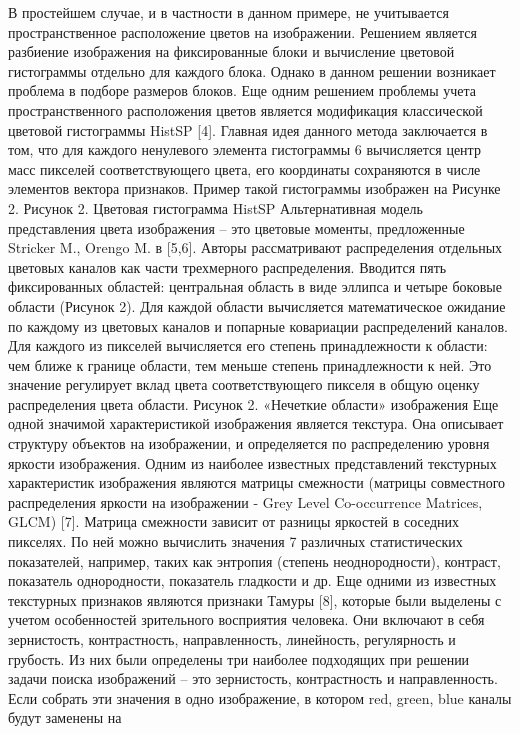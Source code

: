 В простейшем случае, и в частности в данном примере, не учитывается
пространственное расположение цветов на изображении. Решением является разбиение
изображения на фиксированные блоки и вычисление цветовой гистограммы отдельно для
каждого блока. Однако в данном решении возникает проблема в подборе размеров блоков.
Еще одним решением проблемы учета пространственного расположения цветов является
модификация классической цветовой гистограммы HistSP [4]. Главная идея данного
метода заключается в том, что для каждого ненулевого элемента гистограммы 
6
вычисляется центр масс пикселей соответствующего цвета, его координаты сохраняются в
числе элементов вектора признаков. Пример такой гистограммы изображен на Рисунке 2.
Рисунок 2. Цветовая гистограмма HistSP
Альтернативная модель представления цвета изображения – это цветовые
моменты, предложенные Stricker M., Orengo M. в [5,6]. Авторы рассматривают
распределения отдельных цветовых каналов как части трехмерного распределения.
Вводится пять фиксированных областей: центральная область в виде эллипса и четыре
боковые области (Рисунок 2). Для каждой области вычисляется математическое ожидание
по каждому из цветовых каналов и попарные ковариации распределений каналов. Для
каждого из пикселей вычисляется его степень принадлежности к области: чем ближе к
границе области, тем меньше степень принадлежности к ней. Это значение регулирует
вклад цвета соответствующего пикселя в общую оценку распределения цвета области.
Рисунок 2. «Нечеткие области» изображения
Еще одной значимой характеристикой изображения является текстура. Она
описывает структуру объектов на изображении, и определяется по распределению уровня
яркости изображения.
Одним из наиболее известных представлений текстурных характеристик
изображения являются матрицы смежности (матрицы совместного распределения яркости
на изображении - Grey Level Co-occurrence Matrices, GLCM) [7]. Матрица смежности
зависит от разницы яркостей в соседних пикселях. По ней можно вычислить значения 
7
различных статистических показателей, например, таких как энтропия (степень
неоднородности), контраст, показатель однородности, показатель гладкости и др.
Еще одними из известных текстурных признаков являются признаки Тамуры [8],
которые были выделены с учетом особенностей зрительного восприятия человека. Они
включают в себя зернистость, контрастность, направленность, линейность, регулярность и
грубость. Из них были определены три наиболее подходящих при решении задачи поиска
изображений – это зернистость, контрастность и направленность. Если собрать эти
значения в одно изображение, в котором red, green, blue каналы будут заменены на
